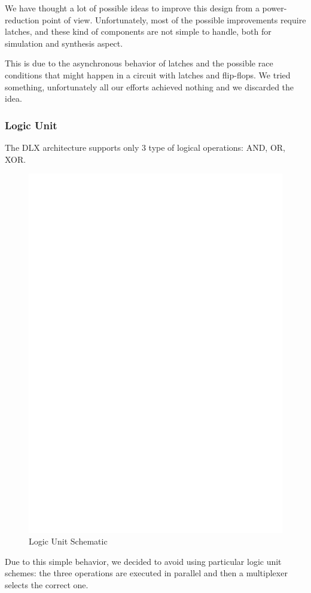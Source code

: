 \documentclass[12pt]{article}
\begin{document}
We have thought a lot of possible ideas to improve this design from a power-reduction point of view. Unfortunately, most of the possible improvements require latches, and these kind of components are not simple to handle, both for simulation and synthesis aspect.

This is due to the asynchronous behavior of latches and the possible race conditions that might happen in a circuit with latches and flip-flops. We tried something, unfortunately all our efforts achieved nothing and we discarded the idea.

\subsubsection{Logic Unit}
The DLX architecture supports only 3 type of logical operations: AND, OR, XOR. 
\begin{figure}[h]
	\includegraphics[center]{images/LOGIC_UNIT.eps}
	\caption{Logic Unit Schematic}
	\label{LU}
\end{figure}
Due to this simple behavior, we decided to avoid using particular logic unit schemes: the three operations are executed in parallel and then a multiplexer selects the correct one. 
\end{document}
